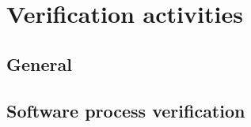 
\section{Verification activities}

\subsection{General}


\subsection{Software process verification}


